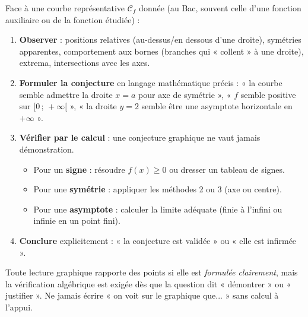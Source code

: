 \documentclass[11pt]{article}
\newcommand{\cle}[1]{{\popxbold\color{popdark}#1}}
\begin{document}
\begin{methode}
Face à une courbe représentative $\mathcal{C}_f$ donnée (au Bac, souvent celle d'une fonction auxiliaire ou de la fonction étudiée) :
\begin{enumerate}
\item \textbf{Observer} : positions relatives (au-dessus/en dessous d'une droite), symétries apparentes, comportement aux bornes (branches qui « collent » à une droite), extrema, intersections avec les axes.
\item \textbf{Formuler la conjecture} en langage mathématique précis : « la courbe semble admettre la droite $x=a$ pour axe de symétrie », « $f$ semble positive sur $[0\,;\,+\infty[$ », « la droite $y=2$ semble être une asymptote horizontale en $+\infty$ ».
\item \textbf{Vérifier par le calcul} : une conjecture graphique ne vaut jamais démonstration.
      \begin{itemize}
      \item Pour un \textbf{signe} : résoudre $f(x)\geq 0$ ou dresser un tableau de signes.
      \item Pour une \textbf{symétrie} : appliquer les méthodes 2 ou 3 (axe ou centre).
      \item Pour une \textbf{asymptote} : calculer la limite adéquate (finie à l'infini ou infinie en un point fini).
      \end{itemize}
\item \textbf{Conclure} explicitement : « la conjecture est validée » ou « elle est infirmée ».
\end{enumerate}
\begin{aretenir}
Toute lecture graphique rapporte des points si elle est \emph{formulée clairement}, mais la \cle{vérification algébrique} est exigée dès que la question dit « démontrer » ou « justifier ». Ne jamais écrire « on voit sur le graphique que... » sans calcul à l'appui.
\end{aretenir}
\end{methode}
\end{document}
